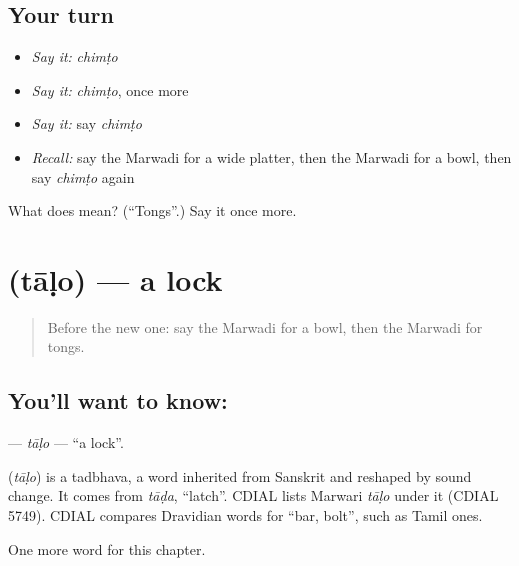 \subsection*{Your turn}
\begin{itemize}
\raggedright
  \item \emph{Say it:} \emph{chimṭo}
  \item \emph{Say it:} \emph{chimṭo}, once more
  \item \emph{Say it:} say \emph{chimṭo}
  \item \emph{Recall:} say the Marwadi for a wide platter, then the Marwadi for a bowl, then say \emph{chimṭo} again
\end{itemize}

\begin{tcolorbox}[breakable,colback=teal!4,colframe=teal!35!black,title={Before you move on}]
What does  mean? (\textquotedblleft{}Tongs\textquotedblright{}.) Say it once more.
\end{tcolorbox}
\section[\texorpdfstring{\mw{ताळो} (tāḷo)}{ताळो (tāḷo)}]{ (tāḷo) — a lock}

\label{lesson:MW-C121-talo}



\begin{quote}
Before the new one: say the Marwadi for a bowl, then the Marwadi for tongs.
\end{quote}

\subsection*{You'll want to know: }
\textbf{} — \emph{tāḷo} — \textquotedblleft{}a lock\textquotedblright{}.

\begin{cousinweb}
\textbf{} (\emph{tāḷo}) is a tadbhava, a word inherited from Sanskrit and reshaped by sound change. It comes from \emph{tāḍa}, \textquotedblleft{}latch\textquotedblright{}. CDIAL lists Marwari \emph{tāḷo} under it (CDIAL 5749). CDIAL compares Dravidian words for \textquotedblleft{}bar, bolt\textquotedblright{}, such as Tamil ones.
\end{cousinweb}

\begin{grammarlens}[title={What you've built}]
One more word for this chapter.
\end{grammarlens}

